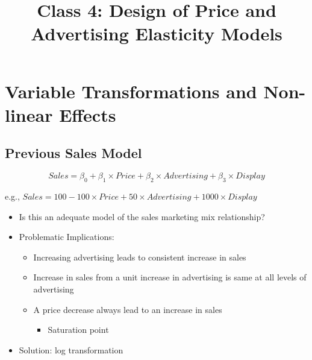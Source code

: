 \documentclass[10pt,article]{article}
\date{\vspace{-6ex}}
\title{Class 4: Design of Price and Advertising Elasticity Models}
\begin{document}
\maketitle
{} 
\thispagestyle{fancy}

\setcounter{tocdepth}{1}
\tableofcontents
\vspace{6ex}

\section{Variable Transformations and Non-linear Effects}
\label{sec:org41be7ab}
\subsection{Previous Sales Model}
\label{sec:orgbc980ad}
\[ Sales = \beta_0 + \beta_1 \times Price + \beta_2 \times Advertising +
           \beta_3 \times Display \]

e.g., \(Sales = 100 -100 \times Price + 50 \times Advertising +
           1000 \times Display\)
\begin{itemize}
\item Is this an adequate model of the sales marketing mix relationship?
\end{itemize}

\begin{itemize}
\item Problematic Implications: 
\begin{itemize}
\item Increasing advertising leads to consistent increase in sales
\item Increase in sales from a unit increase in advertising is same at all
levels of advertising
\item A price decrease always lead to an increase in sales
\begin{itemize}
\item Saturation point
\end{itemize}
\end{itemize}
\end{itemize}

\begin{itemize}
\item Solution: log transformation
\end{itemize}
\end{document}
